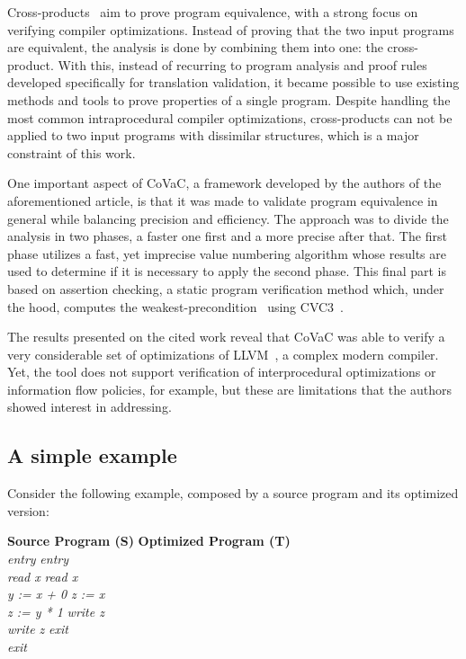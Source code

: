 Cross-products~\cite{DBLP:conf/fm/ZaksP08} aim to prove program equivalence, with a strong focus on verifying compiler optimizations.
Instead of proving that the two input programs are equivalent, the analysis is done by combining them into one: the cross-product.
With this, instead of recurring to program analysis and proof rules developed specifically for translation validation, it became possible to use existing methods and tools to prove properties of a single program. 
Despite handling the most common intraprocedural compiler optimizations, cross-products can not be applied to two input programs with dissimilar structures, which is a major constraint of this work.

One important aspect of CoVaC, a framework developed by the authors of the aforementioned article, is that it was made to validate program equivalence in general while balancing precision and efficiency.
The approach was to divide the analysis in two phases, a faster one first and a more precise after that.
The first phase utilizes a fast, yet imprecise value numbering algorithm whose results are used to determine if it is necessary to apply the second phase. 
This final part is based on assertion checking, a static program verification method which, under the hood, computes the weakest-precondition~\cite{DBLP:books/ph/Dijkstra76} using CVC3~\cite{cvc3}. 

The results presented on the cited work reveal that CoVaC was able to verify a very considerable set of optimizations of LLVM~\cite{llvm}, a complex modern compiler.
Yet, the tool does not support verification of interprocedural optimizations or information flow policies, for example, but these are limitations that the authors showed interest in addressing.


\subsection{A simple example} 
\label{subsec:cross_products_ex}

Consider the following example, composed by a source program and its optimized version:

\begin{tabbing}
  \hspace{2cm}\= \textbf{Source Program (S)} \hspace{2cm} \= \textbf{Optimized Program (T)} \\ 
  \> \emph{entry} \> \emph{entry} \\
  \> \emph{  read x} \> \emph{  read x} \\
  \> \emph{  y := x + 0} \> \emph{  z := x} \\
  \> \emph{  z := y * 1} \> \emph{  write z} \\
  \> \emph{  write z} \> \emph{exit} \\
  \> \emph{exit} \> \emph{} 
  \label{tabbing:cross_products_example_code}
\end{tabbing}

